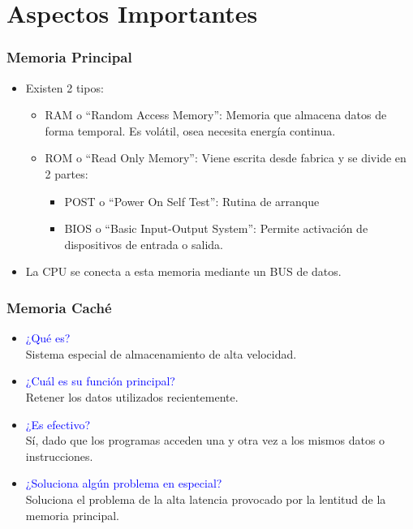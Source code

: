\documentclass{beamer}
\begin{document}
\section{Aspectos Importantes}
\frame
{
\frametitle{Memoria Principal}
\begin{itemize}
\item Existen 2 tipos:
\begin{itemize}
\item RAM o ``Random Access Memory'': Memoria que almacena datos de forma temporal. Es volátil, osea necesita energía continua.
\item ROM o ``Read Only Memory'': Viene escrita desde fabrica y se divide en 2 partes:
\begin{itemize}
\item POST o ``Power On Self Test'': Rutina de arranque
\item BIOS o ``Basic Input-Output System'': Permite activación de dispositivos de entrada o salida.
\end{itemize}
\end{itemize}
\item La CPU se conecta a esta memoria mediante un BUS de datos.
\end{itemize}
}
\frame
{
\frametitle{Memoria Caché}
\begin{itemize}
	\item<1->\textcolor{blue}{¿Qué es?}\\
		Sistema especial de almacenamiento de alta velocidad.
	\item<2->\textcolor{blue}{¿Cuál es su función principal?}\\
		Retener los datos utilizados recientemente.
	\item<3->\textcolor{blue}{¿Es efectivo?}\\
		Sí, dado que los programas acceden una y otra vez a los mismos datos o instrucciones.
	\item<4->\textcolor{blue}{¿Soluciona algún problema en especial?}\\
		Soluciona el problema de la alta latencia provocado por la lentitud de la memoria principal.
\end{itemize}
}
\frame
\end{document}
